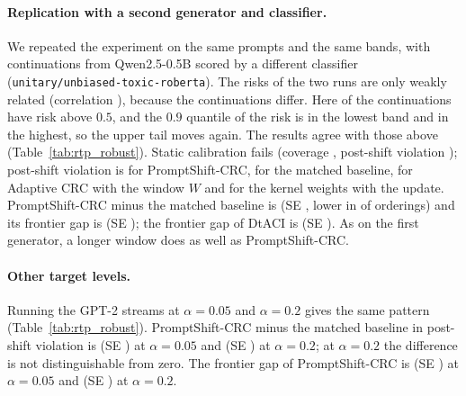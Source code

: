 \paragraph{Replication with a second generator and classifier.}
We repeated the experiment on the same \RtpN{} prompts and the same bands, with continuations from Qwen2.5-0.5B scored by a different classifier (\texttt{unitary/unbiased-toxic-roberta}). The risks of the two runs are only weakly related (correlation \RtpQCorr{}), because the continuations differ. Here \RtpQFracHigh{} of the continuations have risk above $0.5$, and the $0.9$ quantile of the risk is \RtpQQnineLo{} in the lowest band and \RtpQQnineHi{} in the highest, so the upper tail moves again. The results agree with those above (Table~\ref{tab:rtp_robust}). Static calibration fails (coverage \RtpQStaticCov{}, post-shift violation \RtpQStaticPost{}); post-shift violation is \RtpQPSPost{} for PromptShift-CRC, \RtpQMatchedPost{} for the matched baseline, \RtpQAdaptWPost{} for Adaptive CRC with the window $W$ and \RtpQKernelUpdPost{} for the kernel weights with the update. PromptShift-CRC minus the matched baseline is \RtpQPSvsMatchedPost{} (SE \RtpQPSvsMatchedPostSE{}, lower in \RtpQPSvsMatchedPostLower{} of \RtpQPSvsMatchedPostN{} orderings) and its frontier gap is \RtpQFrontierPS{} (SE \RtpQFrontierPSSE{}); the frontier gap of DtACI is \RtpQFrontierDtACI{} (SE \RtpQFrontierDtACISE{}). As on the first generator, a longer window does as well as PromptShift-CRC.

\paragraph{Other target levels.}
Running the GPT-2 streams at $\alpha=0.05$ and $\alpha=0.2$ gives the same pattern (Table~\ref{tab:rtp_robust}). PromptShift-CRC minus the matched baseline in post-shift violation is \RtpAlphaLowPSvsMatchedPost{} (SE \RtpAlphaLowPSvsMatchedPostSE{}) at $\alpha=0.05$ and \RtpAlphaHighPSvsMatchedPost{} (SE \RtpAlphaHighPSvsMatchedPostSE{}) at $\alpha=0.2$; at $\alpha=0.2$ the difference is not distinguishable from zero. The frontier gap of PromptShift-CRC is \RtpAlphaLowFrontierPS{} (SE \RtpAlphaLowFrontierPSSE{}) at $\alpha=0.05$ and \RtpAlphaHighFrontierPS{} (SE \RtpAlphaHighFrontierPSSE{}) at $\alpha=0.2$.
